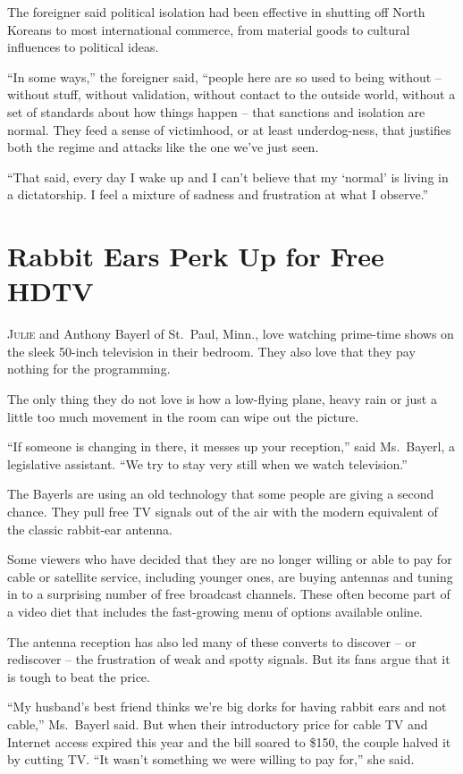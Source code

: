 ﻿\documentclass[12pt]{article}
\begin{document}
The foreigner said political isolation had been effective in shutting off North Koreans to most
international commerce, from material goods to cultural influences to political ideas.

``In some ways,'' the foreigner said, ``people here are so used to being without -- without stuff,
without validation, without contact to the outside world, without a set of standards about how
things happen -- that sanctions and isolation are normal. They feed a sense of victimhood, or at
least underdog-ness, that justifies both the regime and attacks like the one we've just seen.

``That said, every day I wake up and I can't believe that my `normal' is living in a dictatorship. I
feel a mixture of sadness and frustration at what I observe.''

\section{Rabbit Ears Perk Up for Free HDTV}

\lettrine{J}{ulie} and Anthony Bayerl of St.~Paul, Minn., love watching
prime-time shows on the sleek 50-inch television in their bedroom. They also love that they pay
nothing for the programming.

The only thing they do not love is how a low-flying plane, heavy rain or just a little too much
movement in the room can wipe out the picture.

``If someone is changing in there, it messes up your reception,'' said Ms.~Bayerl, a legislative
assistant. ``We try to stay very still when we watch television.''

The Bayerls are using an old technology that some people are giving a second chance. They pull free
TV signals out of the air with the modern equivalent of the classic rabbit-ear antenna.

Some viewers who have decided that they are no longer willing or able to pay for cable or satellite
service, including younger ones, are buying antennas and tuning in to a surprising number of free
broadcast channels. These often become part of a video diet that includes the fast-growing menu of
options available online.

The antenna reception has also led many of these converts to discover -- or rediscover -- the
frustration of weak and spotty signals. But its fans argue that it is tough to beat the price.

``My husband's best friend thinks we're big dorks for having rabbit ears and not cable,'' Ms.~Bayerl
said. But when their introductory price for cable TV and Internet access expired this year and the
bill soared to \$150, the couple halved it by cutting TV. ``It wasn't something we were willing to
pay for,'' she said.
\end{document}
